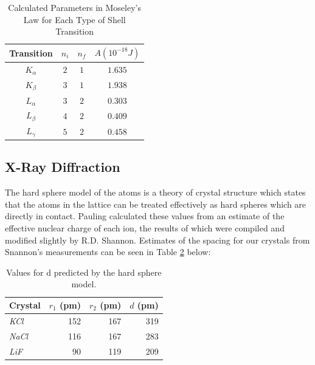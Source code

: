 \documentclass[%
 reprint,
 amsmath,amssymb,
 aps,
 pra,
]{revtex4-1}
\begin{document}
\begin{table}[htbp]
	\begin{center}
		\begin{tabular}{|c|c|c|c|}
			\hline Transition & $n_{i}$  & $n_{f}$ & $A (10^{-18} J)$ \\
			\hline $K_{\alpha}$ & $2$ & $1$ & $1.635$ \\
			\hline $K_{\beta}$ & $3$ & $1$ & $1.938$ \\
			\hline $L_{\alpha}$ & $3$ & $2$ & $0.303$ \\
			\hline $L_{\beta}$ & $4$ & $2$ & $0.409$ \\
			\hline $L_{\gamma}$ & $5$ & $2$ & $0.458$ \\
			\hline
		\end{tabular}
	\end{center}
	\caption{Calculated Parameters in Moseley's Law for Each Type of Shell Transition}
	\label{Tab:RydParam}
\end{table}

\subsection{X-Ray Diffraction}

The hard sphere model of the atoms is a theory of crystal structure which states that the atoms in the lattice can be treated effectively as hard spheres which are directly in contact. Pauling calculated these values from an estimate of the effective nuclear charge of each ion\cite{hard_spheres_2}, the results of which were compiled and modified slightly by R.D. Shannon\cite{hard_spheres}. Estimates of the spacing for our crystals from Snannon's measurements can be seen in Table \ref{table:hardsphere_d} below:

\begin{table}[htbp]
	\begin{center}
	\begin{tabular}{|l|r|r|r|}
		\hline
		\textbf{Crystal} & \multicolumn{1}{l|}{\textbf{$r_1$ (pm)}} & \multicolumn{1}{l|}{\textbf{$r_2$ (pm)}} & \multicolumn{1}{l|}{\textbf{$d$ (pm)}} \\ \hline
		\textit{KCl } & 152 & 167 & 319 \\ \hline
		\textit{NaCl} & 116 & 167 & 283 \\ \hline
		\textit{LiF} & 90 & 119 & 209 \\ \hline
	\end{tabular}
	\end{center}
	\caption{Values for d predicted by the hard sphere model\cite{hard_sphere}.}
	\label{table:hardsphere_d}
\end{table}
\end{document}

